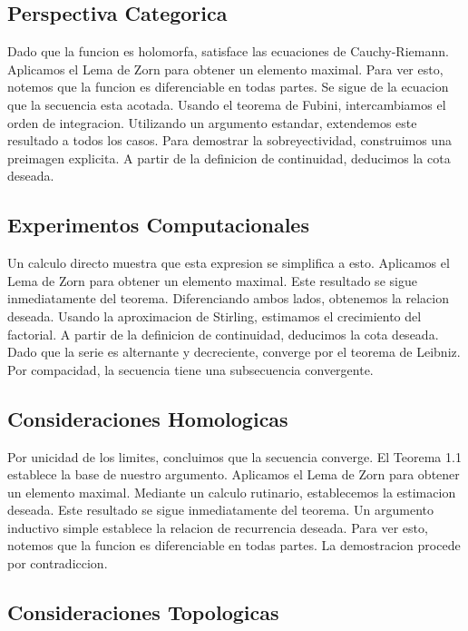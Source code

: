 \documentclass[
]{article}
\begin{document}
\subsection{Perspectiva Categorica}\label{perspectiva-categorica}

Dado que la funcion es holomorfa, satisface las ecuaciones de
Cauchy-Riemann. Aplicamos el Lema de Zorn para obtener un elemento
maximal. Para ver esto, notemos que la funcion es diferenciable en todas
partes. Se sigue de la ecuacion que la secuencia esta acotada. Usando el
teorema de Fubini, intercambiamos el orden de integracion. Utilizando un
argumento estandar, extendemos este resultado a todos los casos. Para
demostrar la sobreyectividad, construimos una preimagen explicita. A
partir de la definicion de continuidad, deducimos la cota deseada.

\subsection{Experimentos
Computacionales}\label{experimentos-computacionales}

Un calculo directo muestra que esta expresion se simplifica a esto.
Aplicamos el Lema de Zorn para obtener un elemento maximal. Este
resultado se sigue inmediatamente del teorema. Diferenciando ambos
lados, obtenemos la relacion deseada. Usando la aproximacion de
Stirling, estimamos el crecimiento del factorial. A partir de la
definicion de continuidad, deducimos la cota deseada. Dado que la serie
es alternante y decreciente, converge por el teorema de Leibniz. Por
compacidad, la secuencia tiene una subsecuencia convergente.

\subsection{Consideraciones
Homologicas}\label{consideraciones-homologicas}

Por unicidad de los limites, concluimos que la secuencia converge. El
Teorema 1.1 establece la base de nuestro argumento. Aplicamos el Lema de
Zorn para obtener un elemento maximal. Mediante un calculo rutinario,
establecemos la estimacion deseada. Este resultado se sigue
inmediatamente del teorema. Un argumento inductivo simple establece la
relacion de recurrencia deseada. Para ver esto, notemos que la funcion
es diferenciable en todas partes. La demostracion procede por
contradiccion.

\subsection{Consideraciones
Topologicas}\label{consideraciones-topologicas}
\end{document}
